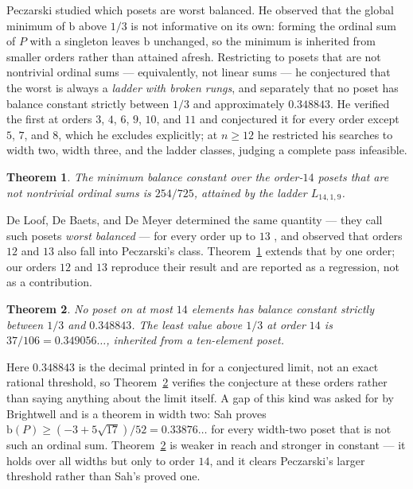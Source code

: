 \documentclass[11pt]{article}
\newtheorem{theorem}{Theorem}
\theoremstyle{definition}
\newcommand{\bal}{\mathrm{b}}
\begin{document}
Peczarski \cite{peczarski-ladders} studied which posets are worst balanced.
He observed that the global minimum of $\bal$ above $1/3$ is not informative
on its own: forming the ordinal sum of $P$ with a singleton leaves $\bal$
unchanged, so the minimum is inherited from smaller orders rather than
attained afresh.  Restricting to posets that are not nontrivial ordinal sums
--- equivalently, not linear sums --- he conjectured that the worst is always
a \emph{ladder with broken rungs}, and separately that no poset has balance
constant strictly between $1/3$ and approximately $0.348843$.  He verified the first at orders $3$, $4$, $6$, $9$, $10$, and $11$ and
conjectured it for every order except $5$, $7$, and $8$, which he excludes
explicitly; at $n\geq12$ he restricted his searches to width two, width three,
and the ladder classes, judging a complete pass infeasible.

\begin{theorem}\label{thm:ladder}
The minimum balance constant over the order-$14$ posets that are not
nontrivial ordinal sums is $254/725$, attained by the ladder $L_{14,1,9}$.
\end{theorem}

De Loof, De Baets, and De Meyer determined the same quantity --- they call
such posets \emph{worst balanced} --- for every order up to $13$
\cite[\S4.2.2]{deloof-census}, and observed that orders $12$ and $13$ also
fall into Peczarski's class.  Theorem~\ref{thm:ladder} extends that by one
order; our orders $12$ and $13$ reproduce their result and are reported as a
regression, not as a contribution.

\begin{theorem}\label{thm:gap}
No poset on at most $14$ elements has balance constant strictly between $1/3$
and $0.348843$.  The least value above $1/3$ at order $14$ is
$37/106 = 0.349056\ldots$, inherited from a ten-element poset.
\end{theorem}

Here $0.348843$ is the decimal printed in \cite{peczarski-ladders} for a
conjectured limit, not an exact rational threshold, so Theorem~\ref{thm:gap}
verifies the conjecture at these orders rather than saying anything about the
limit itself.  A gap of this kind was asked for by Brightwell
\cite{brightwell} and is a theorem in width two: Sah \cite{sah} proves
$\bal(P)\geq(-3+5\sqrt{17})/52 = 0.33876\ldots$ for every width-two poset
that is not such an ordinal sum.  Theorem~\ref{thm:gap} is weaker in reach and
stronger in constant --- it holds over all widths but only to order $14$, and
it clears Peczarski's larger threshold rather than Sah's proved one.
\end{document}
